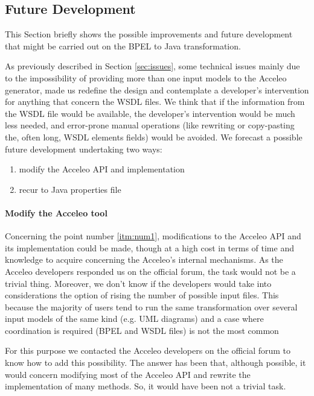 \subsection{Future Development}
\label{sec:FutureDevelopment}
This Section briefly shows the possible improvements and future development that might be carried out on the BPEL to Java transformation.

As previously described in Section \ref{sec:issues}, some technical issues mainly due to the impossibility of providing more than one input models to the Acceleo generator, made us redefine the design and contemplate a developer's intervention 
for anything that concern the WSDL files.
We think that if the information from the WSDL file would be available, the developer's intervention would be much less needed, and error-prone manual operations (like rewriting or copy-pasting the, often long, WSDL elements fields) would be avoided. 
We forecast a possible future development undertaking two ways:
\begin{enumerate}
 \item \label{itm:num1}modify the Acceleo API and implementation
 \item \label{itm:num2}recur to Java properties file 
\end{enumerate}

\paragraph{Modify the Acceleo tool}
Concerning the point number \ref{itm:num1}, modifications to the Acceleo API and its implementation could be made, though at a high cost in terms of time and knowledge to acquire concerning the Acceleo's internal mechanisms. As the Acceleo developers responded us on the official forum, the task would not be a trivial thing.
Moreover, we don't know if the developers would take into considerations the option of rising the number of possible input files. This because the majority of users tend to run the same transformation over several input models of the same kind (e.g. UML diagrams) and a case where coordination is required (BPEL and WSDL files) is not the most common  

For this purpose we contacted the Acceleo developers on the official forum \cite{acceleoForum} to know how to add this possibility. The answer has been that, although possible, it would concern modifying most of the Acceleo API and rewrite the implementation of many methods. So, it would have been not a trivial task.


